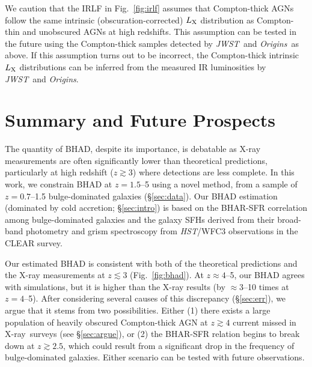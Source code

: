 \documentclass[twocolumn,twocolappendix,times]{aastex63}
\newcommand{\hst}{{\it HST\/}}       %
\newcommand{\jwst}{{\it JWST\/}}
\newcommand{\origins}{{\it Origins\/}}
\newcommand{\xray}{\hbox{X-ray}}  %
\newcommand{\lx}{L_{\rm X}}
\newcommand{\fst}[1]{#1}
\newcommand{\scd}[1]{#1}
\begin{document}
\begin{CJK*}{UTF8}{gbsn}
\fst{We caution that the IRLF in Fig.~\ref{fig:irlf} assumes that Compton-thick AGNs follow the same intrinsic (obscuration-corrected) $\lx$ distribution as Compton-thin and unobscured AGNs at high redshifts. 
This assumption can be tested in the future using the Compton-thick samples detected by \jwst\ and \origins\ as above.}
\scd{If this assumption turns out to be incorrect, the Compton-thick intrinsic $\lx$ distributions can be inferred from the measured IR luminosities by \jwst\ and \origins.}

\section{Summary and Future Prospects}
\label{sec:sum}
The quantity of BHAD, despite its importance, is debatable as X-ray measurements are often significantly lower than theoretical predictions, particularly at high redshift ($z\gtrsim 3$) where detections are less complete. 
In this work, we constrain BHAD at $z=1.5$--5 using a novel method, from a sample of $z=0.7$--1.5 bulge-dominated galaxies (\S\ref{sec:data}).  
Our BHAD estimation \fst{(dominated by cold accretion; \S\ref{sec:intro})} is based on the BHAR-SFR correlation among bulge-dominated galaxies \citep{yang19} and the galaxy SFHs derived from their broad-band photometry and grism spectroscopy from \hst/WFC3 observations in the CLEAR survey.  

Our estimated BHAD is consistent with both of the theoretical 
predictions and the X-ray measurements at $z\lesssim 3$ 
(Fig.~\ref{fig:bhad}). 
At $z\approx 4$--5, our BHAD agrees with simulations, but it is higher than the X-ray results (by $\approx$3--10 times at $z=4$--5). 
After considering several causes of this discrepancy (\S\ref{sec:err}), we argue that it stems from two possibilities.  Either (1) there exists a large population of heavily obscured  Compton-thick AGN at $z \gtrsim 4$ current missed in \xray\ surveys (see \S\ref{sec:argue}), or (2) the BHAR-SFR relation begins to break down at $z \gtrsim 2.5$, which could result from a significant drop in the frequency of bulge-dominated galaxies. Either scenario can be tested with future observations.


\end{CJK*}
\end{document}
